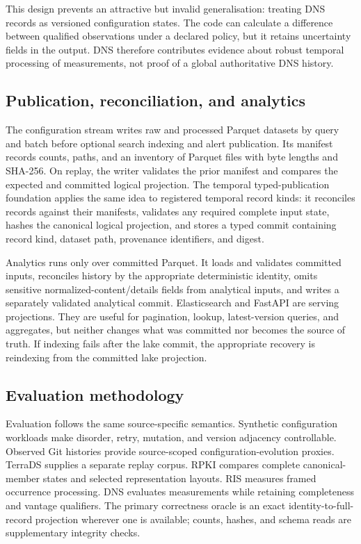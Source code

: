 This design prevents an attractive but invalid generalisation: treating DNS records as versioned configuration states. The code can calculate a difference between qualified observations under a declared policy, but it retains uncertainty fields in the output. DNS therefore contributes evidence about robust temporal processing of measurements, not proof of a global authoritative DNS history.

\subsection{Publication, reconciliation, and analytics}

The configuration stream writes raw and processed Parquet datasets by query and batch before optional search indexing and alert publication. Its manifest records counts, paths, and an inventory of Parquet files with byte lengths and SHA-256. On replay, the writer validates the prior manifest and compares the expected and committed logical projection. The temporal typed-publication foundation applies the same idea to registered temporal record kinds: it reconciles records against their manifests, validates any required complete input state, hashes the canonical logical projection, and stores a typed commit containing record kind, dataset path, provenance identifiers, and digest.

Analytics runs only over committed Parquet. It loads and validates committed inputs, reconciles history by the appropriate deterministic identity, omits sensitive normalized-content/details fields from analytical inputs, and writes a separately validated analytical commit. Elasticsearch and FastAPI are serving projections. They are useful for pagination, lookup, latest-version queries, and aggregates, but neither changes what was committed nor becomes the source of truth. If indexing fails after the lake commit, the appropriate recovery is reindexing from the committed lake projection.

\subsection{Evaluation methodology}

Evaluation follows the same source-specific semantics. Synthetic configuration workloads make disorder, retry, mutation, and version adjacency controllable. Observed Git histories provide source-scoped configuration-evolution proxies. TerraDS supplies a separate replay corpus. RPKI compares complete canonical-member states and selected representation layouts. RIS measures framed occurrence processing. DNS evaluates measurements while retaining completeness and vantage qualifiers. The primary correctness oracle is an exact identity-to-full-record projection wherever one is available; counts, hashes, and schema reads are supplementary integrity checks.

